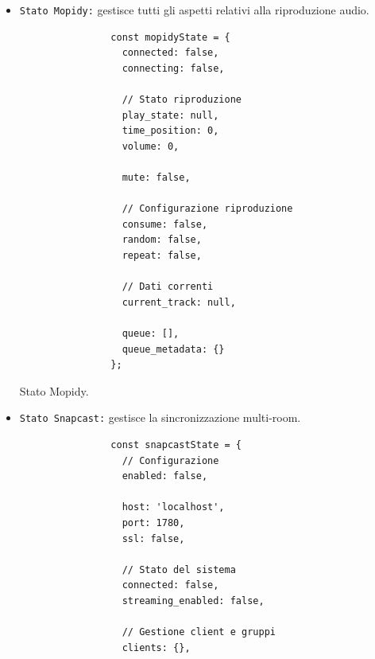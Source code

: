 \begin{itemize}
    \item \texttt{Stato Mopidy:} gestisce tutti gli aspetti relativi alla riproduzione audio.

          \begin{table}[H]
            \begin{algorithm}[H]
              \caption{}
              \BlankLine
              \begin{verbatim}
                const mopidyState = {
                  connected: false,
                  connecting: false,
          
                  // Stato riproduzione
                  play_state: null,
                  time_position: 0,
                  volume: 0,
          
                  mute: false,
          
                  // Configurazione riproduzione
                  consume: false,
                  random: false,
                  repeat: false,
          
                  // Dati correnti
                  current_track: null,
          
                  queue: [],
                  queue_metadata: {}
                };
              \end{verbatim}
            \end{algorithm}
            \caption{Stato Mopidy.}
            \label{tab:stato_mopidy}
          \end{table}
          \newpage
    \item \texttt{Stato Snapcast:} gestisce la sincronizzazione multi-room.

          \begin{table}[H]
            \begin{algorithm}[H]
              \caption{}
              \BlankLine              
              \begin{verbatim}
                const snapcastState = {
                  // Configurazione
                  enabled: false,
          
                  host: 'localhost',
                  port: 1780,
                  ssl: false,
          
                  // Stato del sistema
                  connected: false,
                  streaming_enabled: false,
          
                  // Gestione client e gruppi
                  clients: {},
          

\end{verbatim}
\end{algorithm}
\end{table}
\end{itemize}
